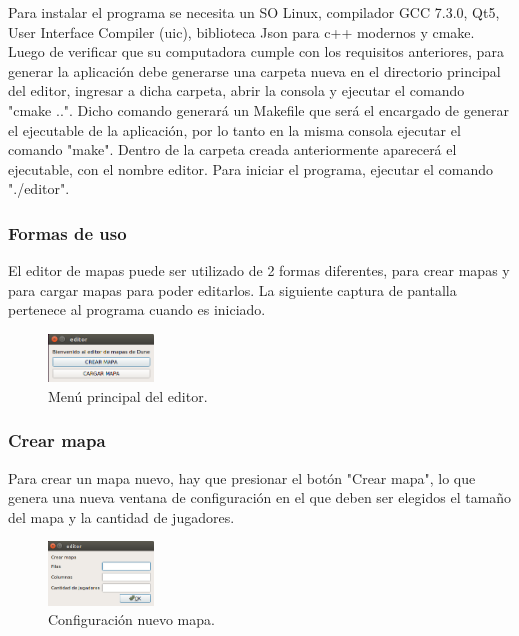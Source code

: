 \documentclass[titlepage,a4paper,12pt]{article}
\begin{document}
Para instalar el programa se necesita un SO Linux, compilador GCC 7.3.0, Qt5, User Interface Compiler (uic), biblioteca Json para c++ modernos y cmake. Luego de verificar que su computadora cumple con los requisitos anteriores, para generar la aplicación debe generarse una carpeta nueva en el directorio principal del editor, ingresar a dicha carpeta, abrir la consola y ejecutar el comando "cmake ..". Dicho comando generará un Makefile que será el encargado de generar el ejecutable de la aplicación, por lo tanto en la misma consola ejecutar el comando "make". Dentro de la carpeta creada anteriormente aparecerá el ejecutable, con el nombre editor. Para iniciar el programa, ejecutar el comando "./editor".\\

\subsubsection{Formas de uso}

El editor de mapas puede ser utilizado de 2 formas diferentes, para crear mapas y para cargar mapas para poder editarlos. La siguiente captura de pantalla pertenece al programa cuando es iniciado.

\begin{figure}[H]
	\centering
	\includegraphics[width=0.25\textwidth]{../imagenes/menu_editor.png}
	\caption{\label{fig:menu_editor} Menú principal del editor.}
\end{figure}

\subsubsection{Crear mapa}

Para crear un mapa nuevo, hay que presionar el botón "Crear mapa", lo que genera una nueva ventana de configuración en el que deben ser elegidos el tamaño del mapa y la cantidad de jugadores.\\

\begin{figure}[H]
	\centering
	\includegraphics[width=0.25\textwidth]{../imagenes/conf_nuevo_mapa.png}
	\caption{\label{fig:menu_editor} Configuración nuevo mapa.}
\end{figure}
\end{document}
